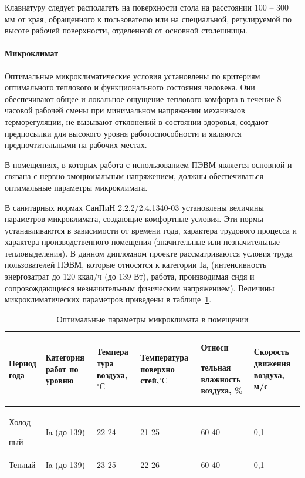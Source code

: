 Клавиатуру следует располагать на поверхности стола на расстоянии 100 – 300 мм от края, обращенного к пользователю или на специальной, регулируемой по высоте рабочей поверхности, отделенной от основной столешницы.

\paragraph{Микроклимат}
Оптимальные микроклиматические условия установлены по критериям оптимального теплового и функционального состояния человека. Они обеспечивают общее и локальное ощущение теплового комфорта в течение 8-часовой рабочей смены при минимальном напряжении механизмов терморегуляции, не вызывают отклонений в состоянии здоровья, создают предпосылки для высокого уровня работоспособности и являются предпочтительными на рабочих местах.
 
В помещениях, в которых работа с использованием ПЭВМ является основной и связана с нервно-эмоциональным напряжением, должны обеспечиваться оптимальные параметры микроклимата. 

В санитарных нормах СанПиН 2.2.2/2.4.1340-03 установлены величины параметров микроклимата, создающие комфортные условия\cite{SanPinAeroIon}. Эти нормы устанавливаются в зависимости от времени года, характера трудового процесса и характера производственного помещения (значительные или незначительные тепловыделения). В данном дипломном проекте рассматриваются условия труда пользователей ПЭВМ, которые относятся к категории Iа, (интенсивность энергозатрат до 120 ккал/ч (до 139 Вт), работа, производимая сидя и сопровождающиеся незначительным физическим напряжением). Величины микроклиматических параметров приведены в таблице~\ref{bzd:microclimat}.

\begin{table}[!htb]
	\caption{Оптимальные параметры микроклимата в помещении}\label{bzd:microclimat}
    \centering
	\begin{tabular}{|p{2cm}|p{}|p{}|p{3cm}|p{3cm}|p{}|}
	\hline 
	Период года & 
	Категория работ по уровню & 
	Темпера тура воздуха,$^{\circ}С$ &
	Температура поверхно стей,$^{\circ}С$ &
	Относи\par тельная влажность воздуха, \% & 
	Скорость движения воздуха, м/с \\ 
	\hline 
	Холод-\par ный & Ia (до 139) & 22-24 & 21-25 & 60-40 & 0,1 \\ 
	\hline 
	Теплый & Ia (до 139) & 23-25 & 22-26 & 60-40 & 0,1\\ 
	\hline 
	\end{tabular} 
    		
\end{table}

